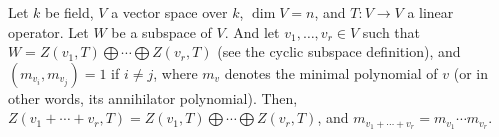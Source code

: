 \documentclass[12pt]{article}
\begin{document}
Let $k$ be field, $V$ a vector space over $k$, $\dim V=n$, and $T:V \to V$ a linear operator. Let $W$ be a subspace of $V$. And let $v_{1},\ldots,v_{r} \in V$ such that $W=Z(v_{1},T) \bigoplus \cdots \bigoplus Z(v_{r},T)$ (see the cyclic subspace definition), and $(m_{v_{i}}, m_{v_{j}})=1$ if $i \neq j$, where $m_{v}$ denotes the minimal polynomial of $v$ (or in other words, its annihilator polynomial). Then, $Z(v_{1}+\cdots+v_{r},T)=Z(v_{1},T) \bigoplus \cdots \bigoplus Z(v_{r}, T)$, and $m_{v_{1}+ \cdots +v_{r}}=m_{v_{1}}  \cdots  m_{v_{r}}$.
\end{document}
